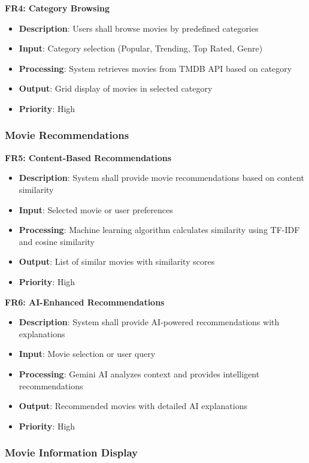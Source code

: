 \documentclass[12pt,a4paper]{article}
\begin{document}
\textbf{FR4: Category Browsing}
\begin{itemize}
    \item \textbf{Description}: Users shall browse movies by predefined categories
    \item \textbf{Input}: Category selection (Popular, Trending, Top Rated, Genre)
    \item \textbf{Processing}: System retrieves movies from TMDB API based on category
    \item \textbf{Output}: Grid display of movies in selected category
    \item \textbf{Priority}: High
\end{itemize}

\subsubsection{Movie Recommendations}

\textbf{FR5: Content-Based Recommendations}
\begin{itemize}
    \item \textbf{Description}: System shall provide movie recommendations based on content similarity
    \item \textbf{Input}: Selected movie or user preferences
    \item \textbf{Processing}: Machine learning algorithm calculates similarity using TF-IDF and cosine similarity
    \item \textbf{Output}: List of similar movies with similarity scores
    \item \textbf{Priority}: High
\end{itemize}

\textbf{FR6: AI-Enhanced Recommendations}
\begin{itemize}
    \item \textbf{Description}: System shall provide AI-powered recommendations with explanations
    \item \textbf{Input}: Movie selection or user query
    \item \textbf{Processing}: Gemini AI analyzes context and provides intelligent recommendations
    \item \textbf{Output}: Recommended movies with detailed AI explanations
    \item \textbf{Priority}: High
\end{itemize}

\subsubsection{Movie Information Display}
\end{document}
